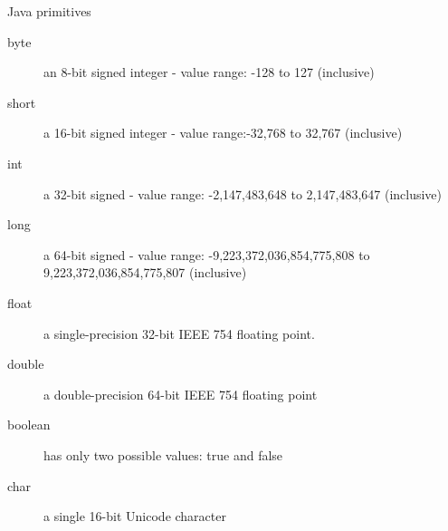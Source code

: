 {  \begin{frame}
    \begin{block}{Java primitives}
      \begin{description}
        \item[byte] an 8-bit signed integer - value range: -128 to 127 (inclusive)
        \item[short] a 16-bit signed  integer - value range:-32,768 to 32,767 (inclusive)
        \item[int] a 32-bit signed - value range: -2,147,483,648 to 2,147,483,647 (inclusive)
        \item[long] a 64-bit signed - value range: -9,223,372,036,854,775,808 to 9,223,372,036,854,775,807 (inclusive)
        \item[float] a single-precision 32-bit IEEE 754 floating point.
        \item[double] a double-precision 64-bit IEEE 754 floating point
        \item[boolean] has only two possible values: true and false
        \item[char] a single 16-bit Unicode character
      \end{description}
    \end{block}
  \end{frame}
}
